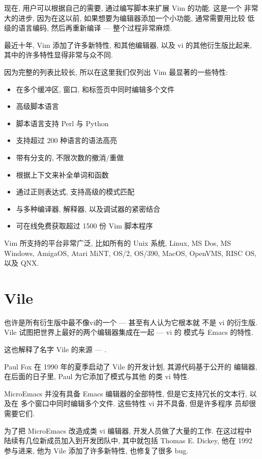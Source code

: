 现在, 用户可以根据自己的需要, 通过编写脚本来扩展 Vim 的功能. 这是一个
非常大的进步, 因为在这以前, 如果想要为编辑器添加一个小功能, 通常需要用比较
低级的语言编码, 然后再重新编译 --- 整个过程非常麻烦.

最近十年, Vim 添加了许多新特性, 和其他编辑器, 以及 vi 的其他衍生版比起来,
其中的许多特性显得非常与众不同.

因为完整的列表比较长, 所以在这里我们仅列出 Vim 最显著的一些特性:
\begin{itemize}
    \item 在多个缓冲区, 窗口, 和标签页中同时编辑多个文件
    \item 高级脚本语言
    \item 脚本语言支持 Perl 与 Python
    \item 支持超过 200 种语言的语法高亮
    \item 带有分支的, 不限次数的撤消/重做
    \item 根据上下文来补全单词和函数
    \item 通过正则表达式, 支持高级的模式匹配
    \item 与多种编译器, 解释器, 以及调试器的紧密结合
    \item 可在线免费获取超过 1500 份 Vim 脚本程序
\end{itemize}
Vim 所支持的平台非常广泛, 比如所有的 Unix 系统, Linux, MS Dos, MS Windows,
AmigaOS, Atari MiNT, OS/2, OS/390, MacOS, OpenVMS, RISC OS, 以及 QNX.

\section{Vile}
 也许是所有衍生版中最不像vi的一个 --- 甚至有人认为它根本就
不是 vi 的衍生版. Vile 试图把世界上最好的两个编辑器集成在一起 --- vi 的
模式与 Emacs 的特性.

这也解释了名字 Vile 的来源 --- .

Paul Fox 在 1990 年的夏季启动了 Vile 的开发计划, 其源代码基于公开的
 编辑器, 在后面的日子里, Paul 为它添加了模式与其他
的类 vi 特性.

MicroEmacs 并没有具备 Emacs 编辑器的全部特性, 但是它支持冗长的文本行,
以及在 多个窗口中同时编辑多个文件. 这些特性 vi 并不具备, 但是许多程序
员却很 需要它们.

为了把 MicroEmacs 改造成类 vi 编辑器, 开发人员做了大量的工作. 在这过程中 
陆续有几位新成员加入到开发团队中, 其中就包括 Thomas E. Dickey, 他在 1992 
参与进来, 他为 Vile 添加了许多新特性, 也修复了很多 bug.

